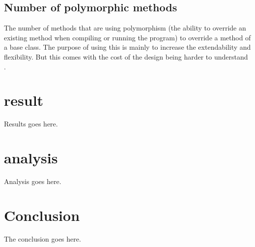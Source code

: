 \documentclass[journal]{IEEEtran}
\begin{document}
\subsection{Number of polymorphic methods}
The number of  methods that are using polymorphism (the ability to override an existing method when compiling or running the program)  to override a method of a base class. The purpose of using this is mainly to increase the extendability and flexibility. But this comes with the cost of the design being harder to understand \cite{qualityassessment}.
\section{result}
Results goes here.
\section{analysis}
Analysis goes here.
\section{Conclusion}
The conclusion goes here.
\newpage



\end{document}
